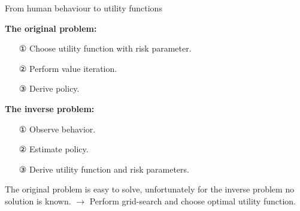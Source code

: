 \large{From human behaviour to utility functions}


\normalsize
\textbf{The original problem:}
\begin{itemize}
\item[①] Choose utility function with risk parameter.
\item[②] Perform value iteration.
\item[③] Derive policy.
\end{itemize}

\textbf{The inverse problem:}
\begin{itemize}
\item[①] Observe behavior.
\item[②] Estimate policy.
\item[③] Derive utility function and risk parameters.
\end{itemize}

The original problem is easy to solve, unfortunately for the inverse problem no solution is known. $\rightarrow$ Perform grid-search and choose optimal utility function.
